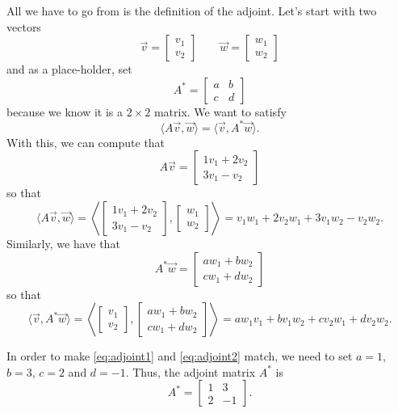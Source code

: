 \begin{exampleSol}
All we have to go from is the definition of the adjoint. Let's start with two vectors 
\[ \vec{v} = \begin{bmatrix} v_1 \\ v_2 \end{bmatrix} \qquad \vec{w} = \begin{bmatrix} w_1 \\ w_2 \end{bmatrix} \] and as a place-holder, set
\[ A^* = \begin{bmatrix} a & b \\ c & d \end{bmatrix} \] because we know it is a $2\times 2$ matrix. We want to satisfy
\[  \langle A\vec{v} , \vec{w} \rangle = \langle \vec{v}, A^*\vec{w} \rangle. \] With this, we can compute that
\[ A\vec{v} = \begin{bmatrix} 1v_1 + 2v_2 \\ 3v_1 - v_2 \end{bmatrix} \] so that 
\begin{equation}
\langle A\vec{v} , \vec{w} \rangle = \left\langle \begin{bmatrix} 1v_1 + 2v_2 \\ 3v_1 - v_2 \end{bmatrix}, \begin{bmatrix} w_1 \\ w_2 \end{bmatrix} \right\rangle = v_1w_1 + 2v_2w_1 + 3v_1w_2 - v_2w_2 .
\label{eq:adjoint1}
\end{equation} Similarly, we have that
\[ A^*\vec{w} = \begin{bmatrix} aw_1 + bw_2 \\ cw_1 + dw_2 \end{bmatrix} \] so that
\begin{equation}
\langle \vec{v}, A^*\vec{w} \rangle = \left\langle \begin{bmatrix} v_1 \\ v_2 \end{bmatrix}, \begin{bmatrix} aw_1 + bw_2 \\ cw_1 + dw_2 \end{bmatrix} \right\rangle = aw_1v_1 + bv_1w_2 + cv_2w_1 + dv_2w_2.
\label{eq:adjoint2}
\end{equation}

In order to make \eqref{eq:adjoint1} and \eqref{eq:adjoint2} match, we need to set $a=1$, $b=3$, $c=2$ and $d=-1$. Thus, the adjoint matrix $A^*$ is
\[ A^* = \begin{bmatrix} 1 & 3 \\ 2 & -1 \end{bmatrix}. \]
\end{exampleSol}

